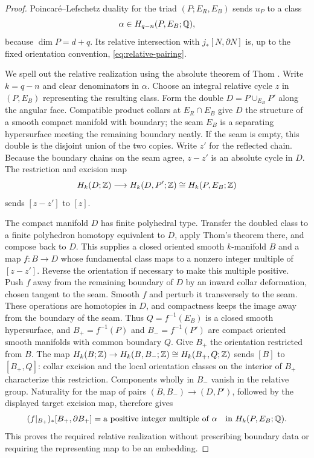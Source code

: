 \begin{proof}
Poincar\'e--Lefschetz duality for the triad
$(P;E_R,E_B)$ \cite[Theorem~3.43]{Hatcher2002} sends $u_P$ to a class
\[
 \alpha\in H_{q-n}(P,E_B;\mathbb Q),
\]
because $\dim P=d+q$.  Its relative intersection with
$j_*[N,\partial N]$ is, up to the fixed orientation convention,
\cref{eq:relative-pairing}.

We spell out the relative realization using the absolute theorem of
Thom \cite[Theorem~III.4]{Thom1954}.  Write $k=q-n$ and clear
denominators in $\alpha$.  Choose an integral relative cycle $z$ in
$(P,E_B)$ representing the resulting class.  Form the double
$D=P\cup_{E_B}P'$ along the angular face.  Compatible product collars
at $E_R\cap E_B$ give $D$ the structure of a smooth compact manifold
with boundary; the seam $E_B$ is a separating hypersurface meeting the
remaining boundary neatly.  If the seam is empty, this double is the
disjoint union of the two copies.  Write $z'$ for the reflected chain.
Because the boundary chains on the seam agree, $z-z'$ is an absolute
cycle in $D$.  The restriction and excision map
\[
 H_k(D;\mathbb Z)\longrightarrow H_k(D,P';\mathbb Z)
       \cong H_k(P,E_B;\mathbb Z)
\]
sends $[z-z']$ to $[z]$.

The compact manifold $D$ has finite polyhedral type. Transfer the doubled
class to a finite polyhedron homotopy equivalent to $D$, apply Thom's
theorem there, and compose back to $D$. This supplies a closed oriented
smooth $k$-manifold $B$ and a map
$f:B\to D$ whose fundamental class maps to a nonzero integer multiple
of $[z-z']$.  Reverse the orientation if necessary to make this
multiple positive.  Push $f$ away from the remaining boundary of $D$
by an inward collar deformation, chosen tangent to the seam.  Smooth
$f$ and perturb it transversely to the seam.  These operations are
homotopies in $D$, and compactness keeps the image away from the
boundary of the seam.  Thus $Q=f^{-1}(E_B)$ is a closed smooth
hypersurface, and $B_+=f^{-1}(P)$ and $B_-=f^{-1}(P')$ are compact
oriented smooth manifolds with common boundary $Q$.  Give
$B_+$ the orientation restricted from $B$.  The map
$H_k(B;\mathbb Z)\to H_k(B,B_-;\mathbb Z)\cong H_k(B_+,Q;\mathbb Z)$ sends $[B]$ to
$[B_+,Q]$: collar excision and the local orientation classes on the
interior of $B_+$ characterize this restriction.  Components wholly
in $B_-$ vanish in the relative group.  Naturality for the map of
pairs $(B,B_-)\to(D,P')$, followed by the displayed target
excision map, therefore gives
\[
 (f|_{B_+})_*[B_+,\partial B_+]
   =\text{a positive integer multiple of }\alpha
       \quad\text{in }H_k(P,E_B;\mathbb Q).
\]
This proves the required relative realization without prescribing
boundary data or requiring the representing map to be an embedding.


\end{proof}
